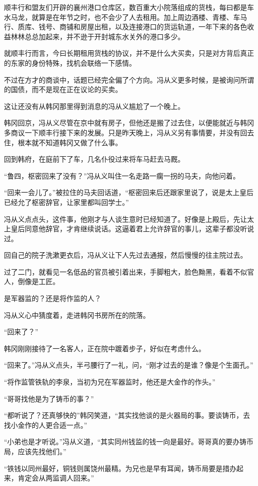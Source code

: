 顺丰行和盟友们开辟的襄州港口仓库区，数百重大小院落组成的货栈，每曰都是车水马龙，就算是在年节之时，也不会少了人去租用。加上周边酒楼、青楼、车马行、质库、钱号、商铺和房屋出租，以及连接港口的货运轨道，一年下来的各色收益林林总总加起来，并不逊于开封城东水关外的港口多少。

就顺丰行而言，今曰长期租用货栈的协议，并不是什么大买卖，只是对方背后真正的东家的身份特殊，找机会联络一下感情。

不过在方才的商谈中，话题已经完全偏了个方向。冯从义更多时候，是被询问所谓的国债，而不是现在正在议论的买卖。

这让还没有从韩冈那里得到消息的冯从义尴尬了一个晚上。

韩冈回京，冯从义尽管在京中就有房子，但他还是搬了过去住，以便能就近与韩冈多商议一下顺丰行接下来的发展。只是昨天晚上，冯从义另有事情要，并没有回去住，根本就不知道韩冈又做了什么事。

回到韩府，在庭前下了车，几名仆役过来将车马赶去马厩。

“鲁四，枢密回来了没有？”冯从义叫住一名走路一瘸一拐的马夫，向他问着。

“回来一会儿了。”被拉住的马夫回话道，“枢密回来后还跟家里说了，说是太上皇后已经允了枢密辞官，让家里都叫回学士。”

冯从义点点头，这件事，他刚才与人谈生意时已经知道了。好像是上殿后，先让太上皇后同意他辞官，才肯继续说话。这逼着君上允许辞官的事儿，这辈子都没听说过。

回自己的院子洗漱更衣后，冯从义让下人先过去通报，然后慢慢的往主院过去。

过了二门，就看见一名低品的官员被引着出来，手脚粗大，脸色黝黑，看着不似官人，倒像是工匠。

是军器监的？还是将作监的人？

冯从义心中猜度着，走进韩冈书房所在的院落。

“回来了？”

韩冈刚刚接待了一名客人，正在院中踱着步子，好似在考虑什么。

“回来了。”冯从义点头，半弓腰行了一礼，问，“刚才过去的是谁？像是个生面孔。”

“将作监管铁轨的李泉，当初为兄在军器监时，他还是大金作的作头。”

“哥哥找他是为了铸币的事？”

“都听说了？还真够快的”韩冈笑道，“其实找他谈的是火器局的事。要谈铸币，去找小金作的人更合适一点。”

“小弟也是才听说。”冯从义道，“其实同州钱监的钱一向是最好。哥哥真的要办铸币局，应该先找他们。”

“铁钱以同州最好，铜钱则属饶州最精。为兄也是早有耳闻，铸币局要是措办起来，肯定会从两监调人回来。”


